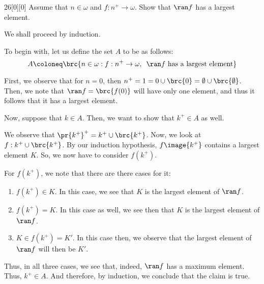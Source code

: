 \documentclass{article}
\begin{document}
\begin{hw}{26}[0][0]
	Assume that $n \in \omega$ and $f: n^{+} \rightarrow \omega$. Show that $\ran f$ has a largest element.
\end{hw}
\begin{solution}
	We shall proceed by induction.
	
	To begin with, let us define the set $A$ to be as follows:
	\begin{equation*}
		A \coloneq \brc{n \in \omega : f : n^{+} \rightarrow \omega,\enskip \ran f \text{ has a largest element}}
	\end{equation*}

	First, we observe that for $n = 0$, then $n^{+} = 1 = 0 \cup \brc{0} = \emptyset \cup \brc{\emptyset}$. Then, we note that $\ran f = \brc{f(0)}$ will have only one element, and thus it follows that it has a largest element.
	
	Now, suppose that $k \in A$. Then, we want to show that $k^{+} \in A$ as well.
	
	We observe that $\pr{k^{+}}^{+} = k^{+} \cup \brc{k^{+}}$. Now, we look at $f : k^{+} \cup \brc{k^{+}}$. By our induction hypothesis, $f\image{k^{+}}$ contains a largest element $K$. So, we now have to consider $f(k^{+})$.
	
	For $f(k^{+})$, we note that there are there cases for it:
	\begin{enumerate}
		\item $f(k^{+}) \in K$. In this case, we see that $K$ is the largest element of $\ran f$.
		\item $f(k^{+}) = K$. In this case as well, we see then that $K$ is the largest element of $\ran f$.
		\item $K \in f(k^{+}) = K'$. In this case then, we observe that the largest element of $\ran f$ will then be $K'$.
	\end{enumerate}

	Thus, in all three cases, we see that, indeed, $\ran f$ has a maximum element. Thus, $k^{+} \in A$. And therefore, by induction, we conclude that the claim is true.
\end{solution}
\end{document}
